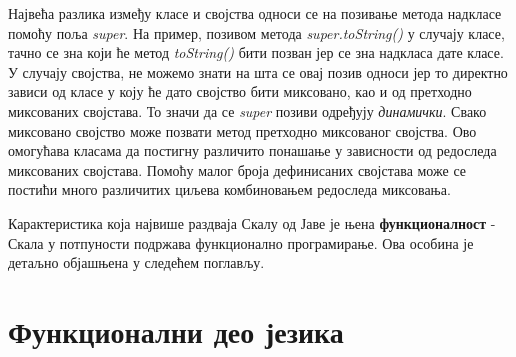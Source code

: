 \documentclass[12pt,oneside]{memoir}
\begin{document}
\begin{description}
Највећа разлика између класе и својства односи се на позивање метода надкласе помоћу поља \textit{super}. На пример, позивом метода \textit{super.toString()} у случају класе, тачно се зна који ће метод \textit{toString()} бити позван јер се зна надкласа дате класе. У случају својства, не можемо знати на шта се овај позив односи јер то директно зависи од класе у коју ће дато својство бити миксовано, као и од претходно миксованих својстава. То значи да се \textit{super} позиви одређују \textit{динамички}. Свако миксовано својство може позвати метод претходно миксованог својства. Ово омогућава класама да постигну различито понашање у зависности од редоследа миксованих својстава. Помоћу малог броја дефинисаних својстава може се постићи много различитих циљева комбиновањем редоследа миксовања.

\end{description}
\par Карактеристика која највише раздваја Скалу од Јаве је њена \textbf{функционалност} - Скала у потпуности подржава функционално програмирање. Ова особина је детаљно објашњена у следећем поглављу.

\section{Функционални део језика}
\label{sec:funkDeoJezika}
\end{document}
